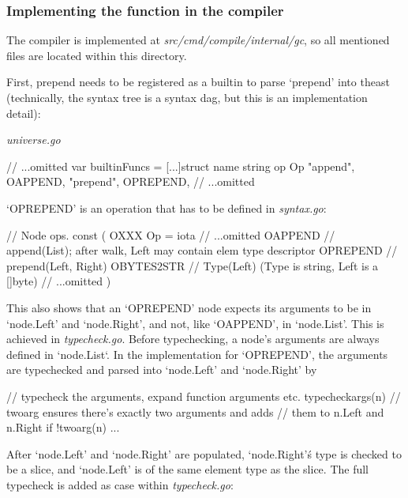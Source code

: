 \subsubsection{Implementing the function in the compiler}

The compiler is implemented at \textit{src/cmd/compile/internal/gc},
so all mentioned files are located within this directory.


First, prepend needs to be registered as a builtin to parse `prepend' into
the\gls{ast} (technically, the syntax tree is a syntax \gls{dag}\cite{ast-node-dag},
but this is an implementation detail):


\textit{universe.go}
\begin{gocode}
// ...omitted
var builtinFuncs = [...]struct {
	name string
	op   Op
}{
	{"append", OAPPEND},
	{"prepend", OPREPEND},
	// ...omitted
}
\end{gocode}

`OPREPEND' is an operation that has to be defined in \textit{syntax.go}:

\begin{gocode}
// Node ops.
const (
	OXXX Op = iota
	// ...omitted
	OAPPEND       // append(List); after walk, Left may contain elem type descriptor
	OPREPEND      // prepend(Left, Right)
	OBYTES2STR    // Type(Left) (Type is string, Left is a []byte)
	// ...omitted
)
\end{gocode}

This also shows that an `OPREPEND' node expects its arguments to be in `node.Left' and `node.Right', and not, like `OAPPEND', in `node.List'. This is achieved in
\textit{typecheck.go}. Before typechecking, a node's arguments are always
defined in `node.List`. In the implementation for `OPREPEND', the arguments are typechecked and parsed
into `node.Left' and `node.Right' by

\begin{gocode}
// typecheck the arguments, expand function arguments etc.
typecheckargs(n)
// twoarg ensures there's exactly two arguments and adds
// them to n.Left and n.Right
if !twoarg(n) ...
\end{gocode}

After `node.Left' and `node.Right' are populated, `node.Right'\'s type is checked to be
a slice, and `node.Left' is of the same element type as the slice.
The full typecheck is added as case within \textit{typecheck.go}:

